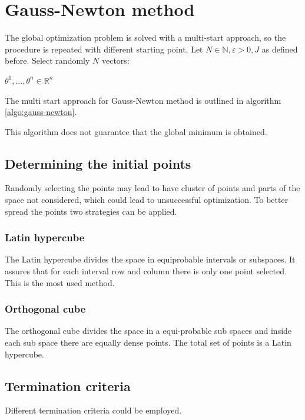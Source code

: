 \section{Gauss-Newton method}
The global optimization problem is solved with a multi-start approach, so the procedure is repeated with different starting point.
Let $N \in \mathbb{N}, \varepsilon > 0, J$ as defined before.
Select randomly $N$ vectors:

$\theta^1, \dots, \theta^n \in \mathbb{R}^n$

The multi start approach for Gauss-Newton method is outlined in algorithm \ref{algo:gauss-newton}.



This algorithm does not guarantee that the global minimum is obtained.

  \subsection{Determining the initial points}
  Randomly selecting the points may lead to have cluster of points and parts of the space not considered, which could lead to unsuccessful optimization.
  To better spread the points two strategies can be applied.

    \subsubsection{Latin hypercube}
    The Latin hypercube divides the space in equiprobable intervals or subspaces.
    It assures that for each interval row and column there is only one point selected.
    This is the most used method.

    \subsubsection{Orthogonal cube}
    The orthogonal cube divides the space in a equi-probable sub spaces and inside each sub space there are equally dense points.
    The total set of points is a Latin hypercube.

  \subsection{Termination criteria}
  Different termination criteria could be employed.

